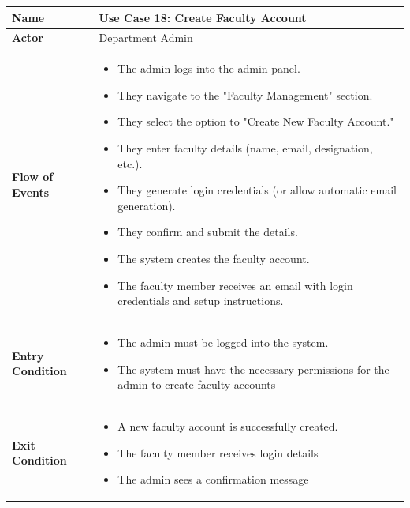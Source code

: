 \documentclass[11pt]{article}
\begin{document}
\begin{center}
\begin{tabular}{ | >{\bfseries}m{6em} | m{10cm} | }
  \hline
  \textbf{Name} & Use Case 18: Create Faculty Account \\
  \hline
  \textbf{Actor} & Department Admin \\
  \hline
  \textbf{Flow of Events} & 
  \begin{itemize}
      \item The admin logs into the admin panel.
      \item They navigate to the "Faculty Management" section.
      \item They select the option to "Create New Faculty Account."
      \item They enter faculty details (name, email, designation, etc.).
      \item They generate login credentials (or allow automatic email generation).
      \item They confirm and submit the details.
      \item The system creates the faculty account.
      \item The faculty member receives an email with login credentials and setup instructions.
  \end{itemize} \\
  \hline
  \textbf{Entry Condition} & 
  \begin{itemize}
      \item The admin must be logged into the system. 
      \item The system must have the necessary permissions for the admin to create
faculty accounts
  \end{itemize} \\
  \hline
  \textbf{Exit Condition} & 
  \begin{itemize}
      \item A new faculty account is successfully created. 
      \item The faculty member receives login details
      \item The admin sees a confirmation message
  \end{itemize} \\
  \hline
\end{tabular}
\end{center}
\end{document}
